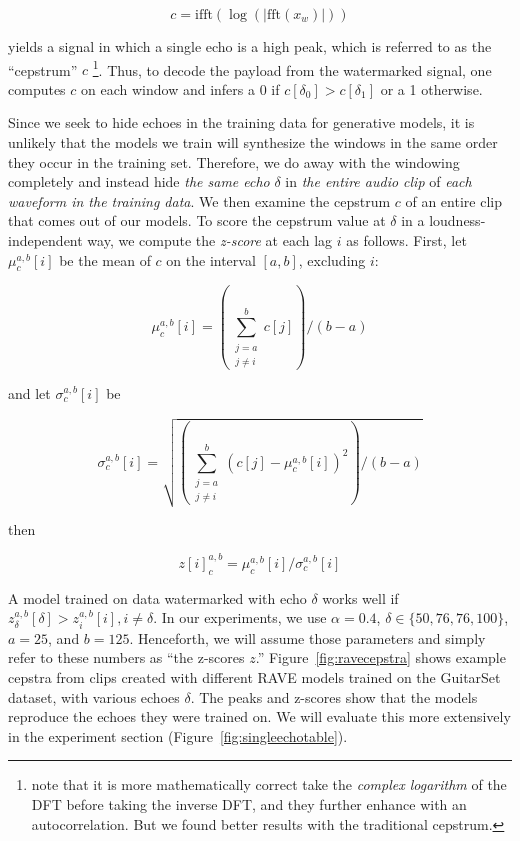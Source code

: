 \documentclass[letterpaper]{article} %
\begin{document}
\begin{equation}
    \label{eq:cepstrum}
    c = \text{ifft} ( \log ( | \text{fft} (x_w) | ) )
\end{equation}
 
yields a signal in which a single echo is a high peak, which is referred to as the ``cepstrum'' $c$ \footnote{\cite{gruhl1996echo} note that it is more mathematically correct take the {\em complex logarithm} of the DFT before taking the inverse DFT, and they further enhance with an autocorrelation.  But we found better results with the traditional cepstrum.}.  Thus, to decode the payload from the watermarked signal, one computes $c$ on each window and infers a 0 if $c[\delta_0] > c[\delta_1]$ or a 1 otherwise.

Since we seek to hide echoes in the training data for generative models, it is unlikely that the models we train will synthesize the windows in the same order they occur in the training set.  Therefore, we do away with the windowing completely and instead hide {\em the same echo} $\delta$ in {\em the entire audio clip} of {\em each waveform in the training data}.  We then examine the cepstrum $c$ of an entire clip that comes out of our models.  To score the cepstrum value at $\delta$ in a loudness-independent way, we compute the {\em z-score} at each lag $i$ as follows.  First, let $\mu_{c}^{a,b}[i]$ be the mean of $c$ on the interval $[a, b]$, excluding $i$:

\begin{equation}
    \mu_{c}^{a,b}[i] = \left( \sum_{\substack{j=a \\ j \neq i}}^{b} c[j] \right) / (b-a)
\end{equation}

and let $\sigma_{c}^{a,b}[i]$ be 

\begin{equation}
    \sigma_{c}^{a,b}[i] = \sqrt{ \left( \sum_{\substack{j=a \\ j \neq i}}^{b} (c[j] - \mu_c^{a,b}[i])^2 \right) / (b-a)}
\end{equation}

then

\begin{equation}
    \label{eq:zscore}
    z[i]_{c}^{a,b} = \mu_{c}^{a,b}[i] / \sigma_{c}^{a,b}[i]
\end{equation}


A model trained on data watermarked with echo $\delta$ works well if $z^{a,b}_{\delta}[\delta] > z^{a,b}_{i}[i], i \neq \delta$.  In our experiments, we use $\alpha = 0.4$, $\delta \in \{50, 76, 76, 100\}$, $a=25$, and $b=125$.  Henceforth, we will assume those parameters and simply refer to these numbers as ``the z-scores $z$.''  Figure~\ref{fig:ravecepstra} shows example cepstra from clips created with different RAVE\cite{caillon2021rave} models trained on the GuitarSet \cite{xi2018guitarset} dataset, with various echoes $\delta$.  The peaks and z-scores show that the models reproduce the echoes they were trained on.  We will evaluate this more extensively in the experiment section (Figure~\ref{fig:singleechotable}).
\end{document}
